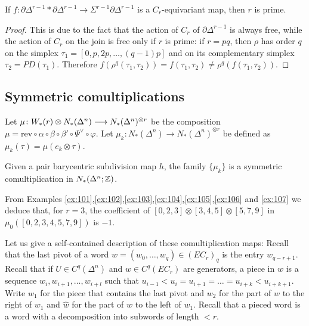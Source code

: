 \begin{lemma}
    If $f\colon \partial \Delta^{r-1}*\partial\Delta^{r-1}\to \Sigma^{r-1}\partial \Delta^{r-1}$ is a $C_r$-equivariant map, then $r$ is prime.
\end{lemma}
\begin{proof}
    This is due to the fact that the action of $C_r$ of $\partial \Delta^{r-1}$ is always free, while the action of $C_r$ on the join is free only if $r$ is prime: if $r=pq$, then $\rho$ has order $q$ on the simplex $\tau_1 = [0,p,2p,\ldots,(q-1)p]$ and on its complementary simplex $\tau_2 = PD(\tau_1)$. Therefore $f(\rho^q(\tau_1,\tau_2)) = f(\tau_1,\tau_2)\neq \rho^q(f(\tau_1,\tau_2))$.
\end{proof}
\subsection{Symmetric comultiplications} Let $\mu\colon W_*(r)\otimes N_*(\Delta^n)\longrightarrow N_*(\Delta^n)^{\otimes r}$ be the composition $\mu = \mathrm{rev}\circ\alpha\circ\beta\circ\beta'\circ\Psi^{\vee}\circ\varphi$. Let $\mu_k\colon N_*(\Delta^n)\to N_*(\Delta^n)^{\otimes r}$ be defined as $\mu_k(\tau) = \mu(e_k\otimes \tau)$. 
\begin{theorem} Given a pair barycentric subdivision map $h$, the family $\{\mu_k\}$ is a symmetric comultiplication in $N_*(\Delta^n;\mathbb{Z})$. 
\end{theorem}
\begin{example}
    From Examples \ref{ex:101},\ref{ex:102},\ref{ex:103},\ref{ex:104},\ref{ex:105},\ref{ex:106} and \ref{ex:107} we deduce that, for $r=3$, the coefficient of $[0,2,3]\otimes [3,4,5]\otimes [5,7,9]$ in $\mu_0([0,2,3,4,5,7,9])$ is $-1$.
\end{example}
Let us give a self-contained description of these comultiplication maps: Recall that the last pivot of a word $w = (w_0,\ldots,w_q)\in (EC_r)_q$ is the entry $w_{q-r+1}$. Recall that if $U\in C^q(\Delta^n)$ and $w\in C^q(EC_r)$ are generators, a piece in $w$ is a sequence $w_i,w_{i+1},\ldots,w_{i+l}$ such that $u_{i-1}<u_i = u_{i+1} = \ldots = u_{i+k} < u_{i+k+1}$. Write $w_1$ for the piece that contains the last pivot and $w_2$ for the part of $w$ to the right of $w_1$ and $\hat{w}$ for the part of $w$ to the left of $w_1$. Recall that a pieced word is a word with a decomposition into subwords of length $<r$.


